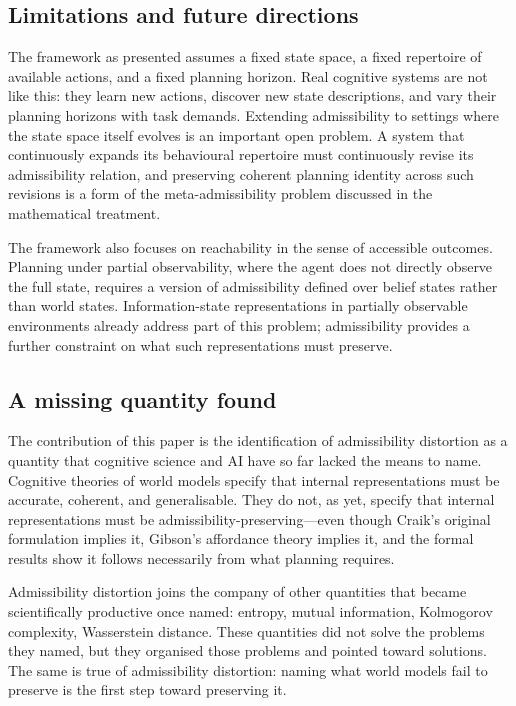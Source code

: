 \documentclass[11pt,a4paper]{article}
\begin{document}
\subsection{Limitations and future directions}

The framework as presented assumes a fixed state space, a fixed repertoire
of available actions, and a fixed planning horizon. Real cognitive systems
are not like this: they learn new actions, discover new state descriptions,
and vary their planning horizons with task demands. Extending admissibility
to settings where the state space itself evolves is an important open problem.
A system that continuously expands its behavioural repertoire must continuously
revise its admissibility relation, and preserving coherent planning identity
across such revisions is a form of the meta-admissibility problem discussed
in the mathematical treatment.

The framework also focuses on reachability in the sense of accessible outcomes.
Planning under partial observability, where the agent does not directly observe
the full state, requires a version of admissibility defined over belief states
rather than world states. Information-state representations in partially
observable environments \citep{kaelbling1998planning} already address part
of this problem; admissibility provides a further constraint on what such
representations must preserve.

\subsection{A missing quantity found}

The contribution of this paper is the identification of admissibility distortion
as a quantity that cognitive science and AI have so far lacked the means to
name. Cognitive theories of world models specify that internal representations
must be accurate, coherent, and generalisable. They do not, as yet, specify
that internal representations must be admissibility-preserving---even though
Craik's original formulation implies it, Gibson's affordance theory implies it,
and the formal results show it follows necessarily from what planning requires.

Admissibility distortion joins the company of other quantities that became
scientifically productive once named: entropy, mutual information, Kolmogorov
complexity, Wasserstein distance. These quantities did not solve the problems
they named, but they organised those problems and pointed toward solutions. The
same is true of admissibility distortion: naming what world models fail to
preserve is the first step toward preserving it.
\end{document}

